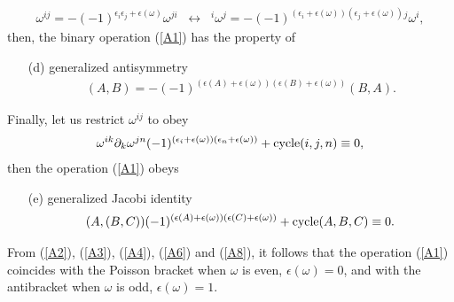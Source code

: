 \documentclass[a4paper,11pt]{article}
\begin{document}
\begin{appendix}
\begin{eqnarray}
\label{A5}
\omega^{ij}=-(-1)^{\epsilon_i\epsilon_j+\epsilon(\omega)}\omega^{ji}
\;\;\leftrightarrow \;\;
{^i\omega^j}=
-(-1)^{(\epsilon_i+\epsilon(\omega))
(\epsilon_j+\epsilon(\omega))}{^j\omega^i},
\end{eqnarray}
then, the binary operation (\ref{A1}) has the property of
\begin{itemize}
\item[(d)] generalized antisymmetry
\begin{eqnarray}
\label{A6} (A,B)=-
(-1)^{(\epsilon(A)+\epsilon(\omega))(\epsilon(B)+\epsilon(\omega))}(B,A).
\end{eqnarray}
\end{itemize}
Finally, let us restrict $\omega^{ij}$ to obey
\begin{eqnarray}
\label{A7} \omega^{ik}\partial_k\omega^{jn}
(-1)^{(\epsilon_i+\epsilon(\omega))(\epsilon_n+\epsilon(\omega))}
+ {\rm cycle} (i,j,n)\equiv 0,
\end{eqnarray}
then the operation (\ref{A1}) obeys
\begin{itemize}
\item[(e)] generalized Jacobi identity
\begin{eqnarray}
\label{A8}
(A,(B,C))(-1)^{(\epsilon(A)+\epsilon(\omega))(\epsilon(C)+\epsilon(\omega))}
+ {\rm cycle} (A,B,C)\equiv 0.
\end{eqnarray}
\end{itemize}
From (\ref{A2}), (\ref{A3}), (\ref{A4}), (\ref{A6}) and (\ref{A8}),
it follows that the operation (\ref{A1}) coincides with the
Poisson bracket when $\omega$ is even, $\epsilon(\omega)=0$, and
with the antibracket when $\omega$ is odd, $\epsilon(\omega)=1$.


\end{appendix}
\end{document}
